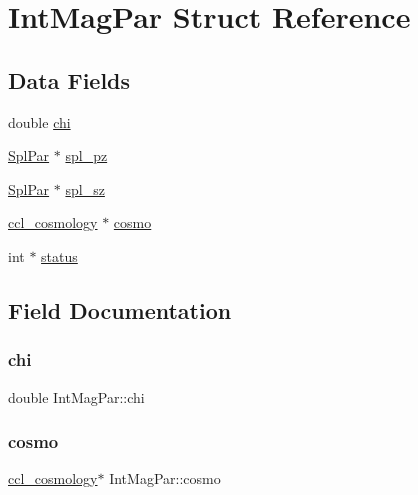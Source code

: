 \hypertarget{struct_int_mag_par}{}\section{Int\+Mag\+Par Struct Reference}
\label{struct_int_mag_par}
\subsection*{Data Fields}
\begin{DoxyCompactItemize}
\item 
double \mbox{\hyperlink{struct_int_mag_par_a5e3fce4ddb56c880350ba7e81f278b65}{chi}}
\item 
\mbox{\hyperlink{struct_spl_par}{Spl\+Par}} $\ast$ \mbox{\hyperlink{struct_int_mag_par_a9711181f7691f7270f82075dd3e383a1}{spl\+\_\+pz}}
\item 
\mbox{\hyperlink{struct_spl_par}{Spl\+Par}} $\ast$ \mbox{\hyperlink{struct_int_mag_par_a18d0a9ebe5e5ed4fbb945e52ef5c7be7}{spl\+\_\+sz}}
\item 
\mbox{\hyperlink{structccl__cosmology}{ccl\+\_\+cosmology}} $\ast$ \mbox{\hyperlink{struct_int_mag_par_ade886ce54b0ccdfaaa48c7a9033b8769}{cosmo}}
\item 
int $\ast$ \mbox{\hyperlink{struct_int_mag_par_a95e214626b6a1bc822ede29ce1b8743d}{status}}
\end{DoxyCompactItemize}


\subsection{Field Documentation}
\mbox{\label{struct_int_mag_par_a5e3fce4ddb56c880350ba7e81f278b65}} 
\subsubsection{\texorpdfstring{chi}{chi}}
{\footnotesize\ttfamily double Int\+Mag\+Par\+::chi}

\mbox{\label{struct_int_mag_par_ade886ce54b0ccdfaaa48c7a9033b8769}} 
\subsubsection{\texorpdfstring{cosmo}{cosmo}}
{\footnotesize\ttfamily \mbox{\hyperlink{structccl__cosmology}{ccl\+\_\+cosmology}}$\ast$ Int\+Mag\+Par\+::cosmo}

